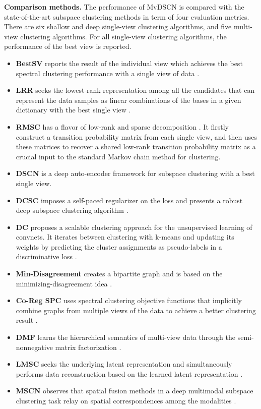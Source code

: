 \documentclass[journal]{IEEEtran}
\begin{document}
\textbf{Comparison methods.}
The performance of MvDSCN is compared with the state-of-the-art subspace clustering methods in term of four evaluation metrics.
There are six shallow and deep single-view clustering algorithms, and five multi-view clustering algorithms.
For all single-view clustering algorithms, the performance of the best view is reported.
\begin{itemize}
  \item {\textbf{BestSV}} reports the result of the individual view which achieves the best spectral clustering performance with a single view of data \cite{Ng2001OnSC}.
  \item {\textbf{LRR}} seeks the lowest-rank representation among all the candidates that can represent the data samples as linear combinations of the bases in a given dictionary with the best single view \cite{Guangcan2013Robust}.
  \item {\textbf{RMSC}} has a flavor of low-rank and sparse decomposition \cite{Xia2014RobustMS}.
It firstly construct a transition probability matrix from each single view, and then uses these matrices to recover a shared low-rank transition probability matrix as a crucial input to the standard Markov chain method for clustering.
  \item {\textbf{DSCN}} is a deep auto-encoder framework for subspace clustering with a best single view. \cite{Peng2016DeepSC}
  \item {\textbf{DCSC}} imposes a self-paced regularizer on the loss and presents a robust deep subspace clustering algorithm \cite{Jiang2018WhenTL}.
  \item {\textbf{DC}} proposes a scalable clustering approach for the unsupervised learning of convnets.
It iterates between clustering with k-means and updating its weights by predicting the cluster assignments as pseudo-labels in a discriminative loss
\cite{Caron2018DeepCF}.
\end{itemize}

\begin{itemize}
  \item {\textbf{Min-Disagreement}} creates a bipartite graph and is based on the minimizing-disagreement idea \cite{Sa2005SpectralCW}.
  \item {\textbf{Co-Reg SPC}} uses spectral clustering objective functions that implicitly combine graphs from multiple views of the data to achieve a better clustering result \cite{Kumar2011CoregularizedMS}.
  \item {\textbf{DMF}} learns the hierarchical semantics of multi-view data through the semi-nonnegative matrix factorization \cite{Zhao2017MultiViewCV}.
  \item {\textbf{LMSC}} seeks the underlying latent representation and simultaneously performs data reconstruction based on the learned latent representation \cite{Zhang2017LatentMS}.
  \item {\textbf{MSCN}} observes that spatial fusion methods in a deep
multimodal subspace clustering task relay on spatial correspondences among the modalities \cite{Abavisani2018DeepMS}.
\end{itemize}
\end{document}
